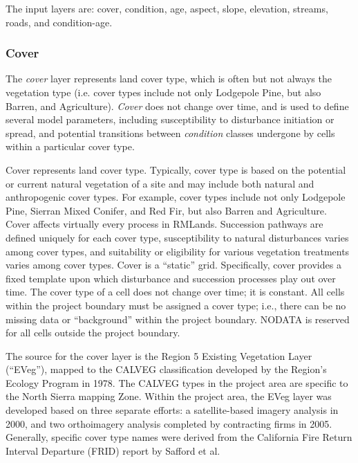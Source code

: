 The input layers are: cover, condition, age, aspect, slope, elevation, streams, roads, and condition-age.


\subsubsection{Cover} The \emph{cover} layer represents land cover type, which is often but not always the vegetation type (i.e. cover types include not only Lodgepole Pine, but also Barren, and Agriculture). \emph{Cover} does not change over time, and is used to define several model parameters, including susceptibility to disturbance initiation or spread, and potential transitions between \emph{condition} classes undergone by cells within a particular cover type.

Cover represents land cover type. Typically, cover type is based on the potential or current natural vegetation of a site and may include both natural and anthropogenic cover types. For example, cover types include not only Lodgepole Pine, Sierran Mixed Conifer, and Red Fir, but also Barren and Agriculture. Cover affects virtually every process in RMLands. Succession pathways are defined uniquely for each cover type, susceptibility to natural disturbances varies among cover types, and suitability or eligibility for various vegetation treatments varies among cover types. Cover is a ``static'' grid. Specifically, cover provides a fixed template upon which disturbance and succession processes play out over time. The cover type of a cell does not change over time; it is constant. All cells within the project boundary must be assigned a cover type; i.e., there can be no missing data or “background” within the project boundary. NODATA is reserved for all cells outside the project boundary.

The source for the cover layer is the Region 5 Existing Vegetation Layer (``EVeg''), mapped to the CALVEG classification developed by the Region's Ecology Program in 1978. The CALVEG types in the project area are specific to the North Sierra mapping Zone. Within the project area, the EVeg layer was developed based on three separate efforts: a satellite-based imagery analysis in 2000, and two orthoimagery analysis completed by contracting firms in 2005. Generally, specific cover type names were derived from the California Fire Return Interval Departure (FRID) report by Safford et al. 

